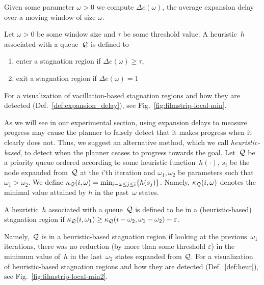 \documentclass{article}
\begin{document}
Given some parameter $\omega >0$ we compute $\Delta e(\omega)$, the average expansion delay over a moving window of size $\omega$. 
\begin{definition}
\label{def:expansion_delay}
Let 
$\omega>0$ be some window size
and
$\tau$ be some threshold value.
A heuristic~$h$ associated with a queue~$\mathcal{Q}$ is defined to
\begin{enumerate}
	\item enter a stagnation region if $\Delta e(\omega) \geq \tau$,
	\item exit a stagnation region if $\Delta e(\omega) = 1$
\end{enumerate}
\end{definition}
For a visualization of vacillation-based stagnation regions and how they are detected (Def.~\ref{def:expansion_delay}), see Fig.~\ref{fig:filmstrip-local-min}.

As we will see in our experimental section, using expansion delays to measure progress may cause the planner to falsely detect that it makes progress when it clearly does not.
Thus, we suggest an alternative method, which we call \emph{heuristic-based}, to detect when the planner ceases to progress towards the goal.
Let~$\mathcal{Q}$ be a priority queue 
ordered according to some heuristic function~$h(\cdot)$,
$s_i$ be the node expanded from~$\mathcal{Q}$ at the $i$'th iteration and $\omega_1, \omega_2$ be parameters such that $\omega_1 > \omega_2$.
%
We define 
$\kappa_{\mathcal{Q}}(i, \omega) = \min_{i-\omega \leq j \leq i} \{ h(s_j)\}$.
Namely, $\kappa_{\mathcal{Q}}(i, \omega)$ denotes the minimal value attained by $h$ in the past~$\omega$ states. 
%
\begin{definition}
\label{def:heur}
A heuristic~$h$ associated with a queue~$\mathcal{Q}$ is defined to be in a (heuristic-based) stagnation region if 
$\kappa_{\mathcal{Q}}(i, \omega_1) \geq \kappa_{\mathcal{Q}}(i - \omega_2, \omega_1 - \omega_2) - \varepsilon$.
\end{definition}
\noindent Namely,~$\mathcal{Q}$ is in a heuristic-based stagnation region if looking at the previous~$\omega_1$ iterations, 
there was no reduction 
(by more than some threshold $\varepsilon$) 
in the minimum value of~$h$ 
in the last~$\omega_2$ states expanded from $\mathcal{Q}$.
%
%
For a visualization of heuristic-based stagnation regions and how they are detected (Def.~\ref{def:heur}), see Fig.~\ref{fig:filmstrip-local-min2}.
\end{document}

